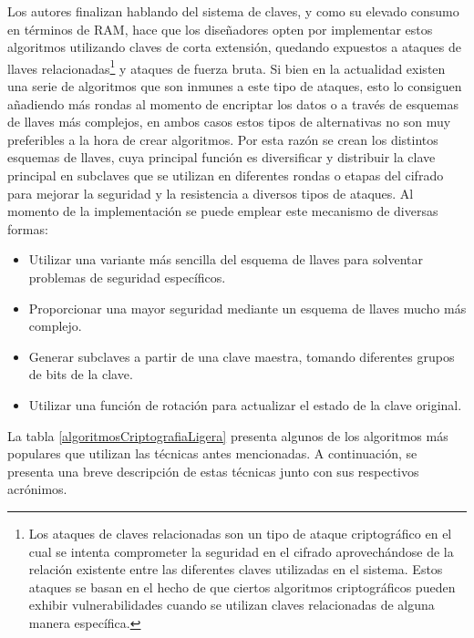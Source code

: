 \documentclass[a4paper,10pt]{article}
\begin{document}
	Los autores finalizan hablando del sistema de claves, y como su elevado consumo en términos de RAM, hace que los diseñadores opten por implementar estos algoritmos utilizando claves de corta extensión, quedando expuestos a ataques de llaves relacionadas\footnote{Los ataques de claves relacionadas son un tipo de ataque criptográfico en el cual se intenta comprometer la seguridad en el cifrado aprovechándose de la relación existente entre las diferentes claves utilizadas en el sistema. Estos ataques se basan en el hecho de que ciertos algoritmos criptográficos pueden exhibir vulnerabilidades cuando se utilizan claves relacionadas de alguna manera específica.} y ataques de fuerza bruta. Si bien en la actualidad existen una serie de algoritmos que son inmunes a este tipo de ataques, esto lo consiguen añadiendo más rondas al momento de encriptar los datos o a través de esquemas de llaves más complejos, en ambos casos estos tipos de alternativas no son muy preferibles a la hora de crear algoritmos. Por esta razón se crean los distintos esquemas de llaves, cuya principal función es diversificar y distribuir la clave principal en subclaves que se utilizan en diferentes rondas o etapas del cifrado para mejorar la seguridad y la resistencia a diversos tipos de ataques. Al momento de la implementación se puede emplear este mecanismo de diversas formas:
	\begin{itemize}
		\item Utilizar una variante más sencilla del esquema de llaves para solventar problemas de seguridad específicos.
		\item Proporcionar una mayor seguridad mediante un esquema de llaves mucho más complejo.
		\item Generar subclaves a partir de una clave maestra, tomando diferentes grupos de bits de la clave.
		\item Utilizar una función de rotación para actualizar el estado de la clave original.
	\end{itemize}
	La tabla \ref{algoritmosCriptografiaLigera} presenta algunos de los algoritmos más populares que utilizan las técnicas antes mencionadas. A continuación, se presenta una breve descripción de estas técnicas junto con sus respectivos acrónimos.
\end{document}
